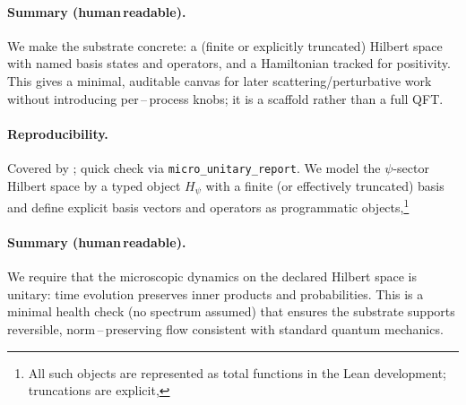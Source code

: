 \documentclass[aps,prd,twocolumn,superscriptaddress,nofootinbib,floatfix,longbibliography]{revtex4-2}
\newcommand{\lean}[1]{\texttt{\detokenize{#1}}}
\begin{document}
\paragraph*{Summary (human\,readable).}
We make the substrate concrete: a (finite or explicitly truncated) Hilbert space with named basis states and operators, and a Hamiltonian tracked for positivity. This gives a minimal, auditable canvas for later scattering/perturbative work without introducing per\,–\,process knobs; it is a scaffold rather than a full QFT.
\paragraph*{Reproducibility.}
Covered by \lean{MicroUnitaryCert}; quick check via \texttt{micro\_unitary\_report}.
We model the $\psi$-sector Hilbert space by a typed object $H_\psi$ with a finite (or effectively truncated) basis and define explicit basis vectors and operators as programmatic objects,\footnote{All such objects are represented as total functions in the Lean development; truncations are explicit,}
%
\paragraph*{Summary (human\,readable).}
We require that the microscopic dynamics on the declared Hilbert space is unitary: time evolution preserves inner products and probabilities. This is a minimal health check (no spectrum assumed) that ensures the substrate supports reversible, norm\,–\,preserving flow consistent with standard quantum mechanics.
\end{document}
